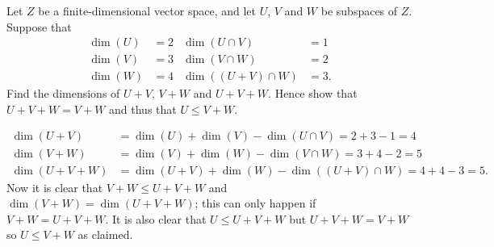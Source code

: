 \begin{exercise}\label{ex-two-subspaces-numbers}
 Let $Z$ be a finite-dimensional vector space, and let $U$,
 $V$ and $W$ be subspaces of $Z$.  Suppose that
 \begin{align*}
  \dim(U) &= 2  & \dim(U\cap V) &= 1 \\
  \dim(V) &= 3  & \dim(V\cap W) &= 2 \\
  \dim(W) &= 4  & \dim((U+V)\cap W) &= 3.
 \end{align*}
 Find the dimensions of $U+V$, $V+W$ and $U+V+W$.  Hence
 show that $U+V+W=V+W$ and thus that $U\leq V+W$.
\end{exercise}
\begin{solution}
 \begin{align*}
  \dim(U+V) &= \dim(U)+\dim(V)-\dim(U\cap V)=2+3-1=4\\
  \dim(V+W) &= \dim(V)+\dim(W)-\dim(V\cap W)=3+4-2=5\\
  \dim(U+V+W) &= \dim(U+V)+\dim(W)-\dim((U+V)\cap W)
               = 4+4-3=5.
 \end{align*}
 Now it is clear that $V+W\leq U+V+W$ and
 $\dim(V+W)=\dim(U+V+W)$; this can only happen if
 $V+W=U+V+W$.  It is also clear that $U\leq U+V+W$ but
 $U+V+W=V+W$ so $U\leq V+W$ as claimed.
\end{solution}

